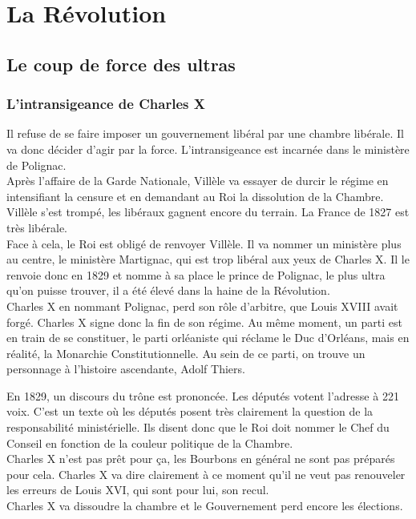 \documentclass[10pt, a4paper, openany]{book}
\begin{document}
\section{La Révolution}

\subsection{Le coup de force des ultras}

\subsubsection{L'intransigeance de Charles X}

Il refuse de se faire imposer un gouvernement libéral par une chambre libérale. Il va donc décider d'agir par la force. L'intransigeance est incarnée dans le ministère de Polignac. \\
Après l'affaire de la Garde Nationale, Villèle va essayer de durcir le régime en intensifiant la censure et en demandant au Roi la dissolution de la Chambre. Villèle s'est trompé, les libéraux gagnent encore du terrain. La France de 1827 est très libérale. \\
Face à cela, le Roi est obligé de renvoyer Villèle. Il va nommer un ministère plus au centre, le ministère Martignac, qui est trop libéral aux yeux de Charles X. Il le renvoie donc en 1829 et nomme à sa place le prince de Polignac, le plus ultra qu'on puisse trouver, il a été élevé dans la haine de la Révolution. \\
Charles X en nommant Polignac, perd son rôle d'arbitre, que Louis XVIII avait forgé. Charles X signe donc la fin de son régime. Au même moment, un parti est en train de se constituer, le parti orléaniste qui réclame le Duc d'Orléans, mais en réalité, la Monarchie Constitutionnelle. Au sein de ce parti, on trouve un personnage à l'histoire ascendante, Adolf Thiers.


En 1829, un discours du trône est prononcée. Les députés votent l'adresse à 221 voix. C'est un texte où les députés posent très clairement la question de la responsabilité ministérielle. Ils disent donc que le Roi doit nommer le Chef du Conseil en fonction de la couleur politique de la Chambre. \\
Charles X n'est pas prêt pour ça, les Bourbons en général ne sont pas préparés pour cela. Charles X va dire clairement à ce moment qu'il ne veut pas renouveler les erreurs de Louis XVI, qui sont pour lui, son recul. \\
Charles X va dissoudre la chambre et le Gouvernement perd encore les élections. 
\end{document}

